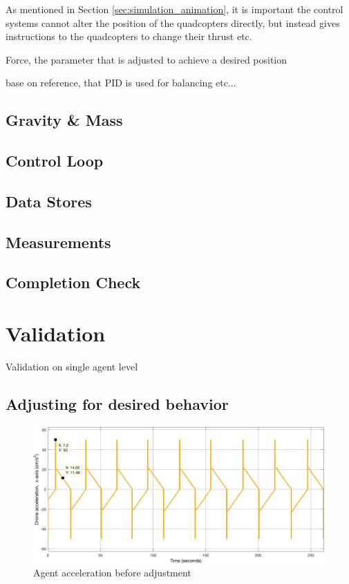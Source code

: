 As mentioned in Section \ref{sec:simulation_animation}, it is important the control systems cannot alter the position of the quadcopters directly, but instead gives instructions to the quadcopters to change their thrust etc. 

Force, the parameter that is adjusted to achieve a desired position

base on reference, that PID is used for balancing etc...

\subsection{Gravity \& Mass}
\label{sec:sim_gravity}

\subsection{Control Loop}

\subsection{Data Stores}

\subsection{Measurements}

\subsection{Completion Check}

\section{Validation}
\label{sec:validation}

Validation on single agent level

\subsection{Adjusting for desired behavior}
\label{sec:tuning}

\begin{figure}[H]
  \centering
  \includegraphics[width=1\columnwidth]{figures/SA_accel_pre_adjustment}
  \caption{\label{fig:pre_adjust}Agent acceleration before adjustment}
\end{figure}

